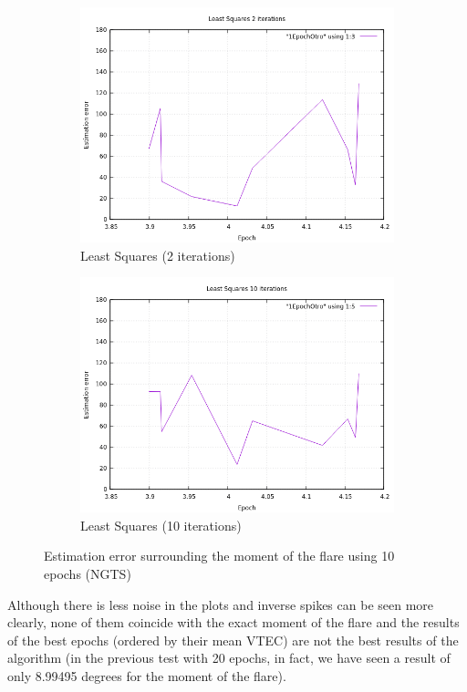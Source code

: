 \begin{figure}[!htb]
\begin{subfigure}[b]{0.5\textwidth}
		\includegraphics[width=\linewidth]{images/resultsStellar/10Epochs1Epoch/otro/1EpochLS2.png}
		\caption{Least Squares (2 iterations)}
	\end{subfigure}
	\hfill
	\begin{subfigure}[b]{0.5\textwidth}
		\includegraphics[width=\linewidth]{images/resultsStellar/10Epochs1Epoch/otro/1EpochLS10.png}
		\caption{Least Squares (10 iterations)}
	\end{subfigure}
	\caption{Estimation error surrounding the moment of the flare using 10 epochs (NGTS)}
	\label{fig:UL1Epoch10}
\end{figure}

Although there is less noise in the plots and inverse spikes can be seen more clearly, none of them coincide with the exact moment of the flare and the results of the best epochs (ordered by their mean VTEC) are not the best results of the algorithm (in the previous test with 20 epochs, in fact, we have seen a result of only 8.99495 degrees for the moment of the flare).

